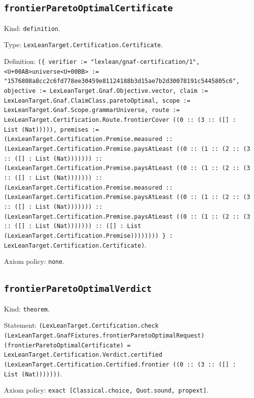 \documentclass[11pt]{article}
\begin{document}
\subsection*{\texttt{frontierParetoOptimalCertificate}}
\noindent Kind: \texttt{definition}.\par
\noindent Type: \texttt{LexLeanTarget.Certification.Certificate}.\par
\noindent Definition: \texttt{(\{ verifier := "lexlean/gnaf-certification/1", <U+00AB>universe<U+00BB> := "1576808a8cc2c6fd778ee30459e81124188b3d15ae7b2d30078191c5445805c6", objective := LexLeanTarget.Gnaf.Objective.vector, claim := LexLeanTarget.Gnaf.ClaimClass.paretoOptimal, scope := LexLeanTarget.Gnaf.Scope.grammarUniverse, route := LexLeanTarget.Certification.Route.frontierCover ((0 :: (3 :: ([] : List (Nat))))), premises := (LexLeanTarget.Certification.Premise.measured :: (LexLeanTarget.Certification.Premise.paysAtLeast ((0 :: (1 :: (2 :: (3 :: ([] : List (Nat))))))) :: (LexLeanTarget.Certification.Premise.paysAtLeast ((0 :: (1 :: (2 :: (3 :: ([] : List (Nat))))))) :: (LexLeanTarget.Certification.Premise.measured :: (LexLeanTarget.Certification.Premise.paysAtLeast ((0 :: (1 :: (2 :: (3 :: ([] : List (Nat))))))) :: (LexLeanTarget.Certification.Premise.paysAtLeast ((0 :: (1 :: (2 :: (3 :: ([] : List (Nat))))))) :: ([] : List (LexLeanTarget.Certification.Premise)))))))) \} : LexLeanTarget.Certification.Certificate)}.\par
\noindent Axiom policy: \texttt{none}.\par
\subsection*{\texttt{frontierParetoOptimalVerdict}}
\noindent Kind: \texttt{theorem}.\par
\noindent Statement: \texttt{(LexLeanTarget.Certification.check (LexLeanTarget.GnafFixtures.frontierParetoOptimalRequest) (frontierParetoOptimalCertificate) = LexLeanTarget.Certification.Verdict.certified (LexLeanTarget.Certification.Certified.frontier ((0 :: (3 :: ([] : List (Nat)))))))}.\par
\noindent Axiom policy: \texttt{exact [Classical.choice, Quot.sound, propext]}.\par
\end{document}
